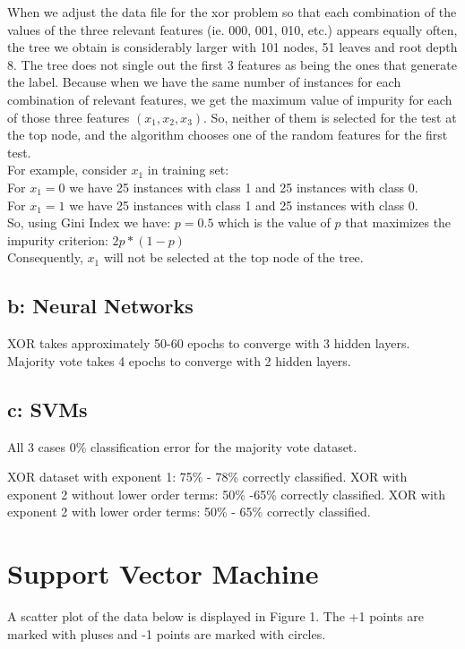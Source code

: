 \documentclass{article}
\begin{document}
When we adjust the data file for the xor problem so that each combination of the values of the three relevant features (ie. 000, 001, 010, etc.) appears equally often, the tree we obtain is considerably larger with 101 nodes, 51 leaves and root depth 8. The tree does not single out the first 3 features as being the ones that generate the label.
Because when we have the same number of instances for each combination of relevant features, we get the maximum value of impurity for each of those three features $(x_1, x_2, x_3)$. So, neither of them is selected for the test at the top node, and the algorithm chooses one of the random features for the first test. \\
For example, consider $x_1$ in training set: \\
For $x_1=0$ we have 25 instances with class 1 and 25 instances with class 0. \\
For $x_1=1$ we have 25 instances with class 1 and 25 instances with class 0. \\
So, using Gini Index we have: $p = 0.5$ which is the value of $p$ that maximizes the impurity criterion: $2 p * (1 - p)$ \\
Consequently, $x_1$ will not be selected at the top node of the tree.


\subsection*{b: Neural Networks}

XOR takes approximately 50-60 epochs to converge with 3 hidden layers. 
Majority vote takes 4 epochs to converge with 2 hidden layers.

\subsection*{c: SVMs}

All 3 cases 0\% classification error for the majority vote dataset. 

XOR dataset with exponent 1: 75\% - 78\% correctly classified.
XOR with exponent 2 without lower order terms: 50\% -65\% correctly classified. 
XOR with exponent 2 with lower order terms: 50\% - 65\% correctly classified. 

\section{Support Vector Machine}

A scatter plot of the data below is displayed in Figure 1. The +1 points are marked with pluses and -1 points are marked with circles.
\end{document}
